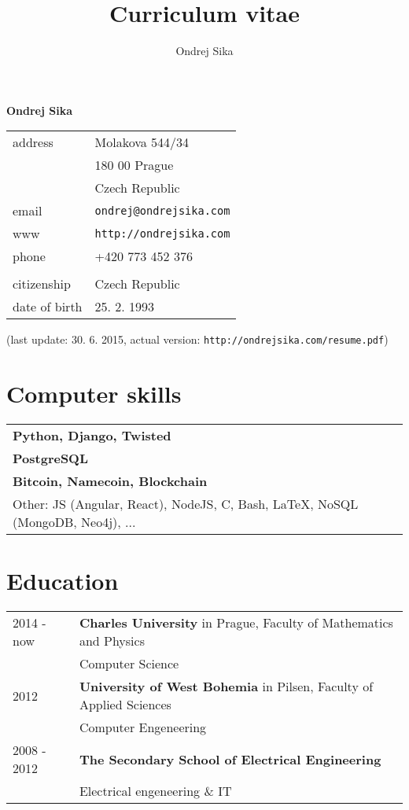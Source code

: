 \documentclass[12pt,a4paper]{article}
\title{Curriculum vitae}
\author{Ondrej Sika}
\begin{document}
\begin{center}
{\LARGE \bf Ondrej Sika}\\
\vspace*{0.2cm}
\begin{tabular}{R{5cm}L{5cm}}
address & Molakova 544/34\\
 & 180 00 Prague\\
 & Czech Republic\\
email & \texttt{ondrej@ondrejsika.com}\\
www & \texttt{http://ondrejsika.com}\\
phone & +420 773 452 376\\
\\
citizenship & Czech Republic\\
date of birth & 25. 2. 1993\\
\end{tabular}

\vspace*{0.2cm}
{\small (last update: 30. 6. 2015, actual version: \texttt{http://ondrejsika.com/resume.pdf})}
\end{center}

\section*{Computer skills}
\begin{tabular}{@{}ll}
{\bf Python, Django, Twisted} & \\
{\bf PostgreSQL} & \\
{\bf Bitcoin, Namecoin, Blockchain} & \\
Other: JS (Angular, React), NodeJS, C, Bash, LaTeX, NoSQL (MongoDB, Neo4j), ... & \\
\end{tabular}

\section*{Education}
\begin{tabular}{@{}p{2cm}l}
2014 - now & {\bf Charles University} in Prague, Faculty of Mathematics and Physics\\
 & Computer Science\\
2012  & {\bf University of West Bohemia} in Pilsen, Faculty of Applied Sciences\\
 & Computer Engeneering\\
2008 - 2012 & {\bf The Secondary School of Electrical Engineering}\\
 & Electrical engeneering \& IT\\
\end{tabular}
\end{document}
